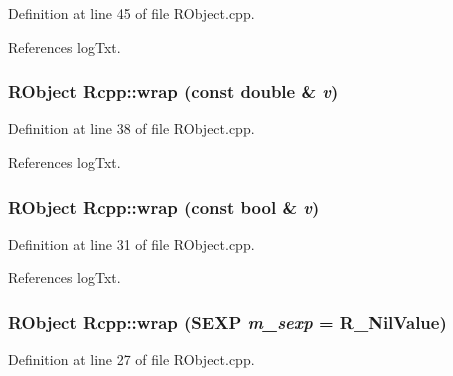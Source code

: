 Definition at line 45 of file RObject.cpp.

References logTxt.\hypertarget{namespaceRcpp_a4736ca32ac9aef778a1cddf60171fd9c}{
\subsubsection[{wrap}]{\setlength{\rightskip}{0pt plus 5cm}RObject Rcpp::wrap (const double \& {\em v})}}
\label{namespaceRcpp_a4736ca32ac9aef778a1cddf60171fd9c}


Definition at line 38 of file RObject.cpp.

References logTxt.\hypertarget{namespaceRcpp_afec8977a6c3fcfc0ab37a9e2a7ba9657}{
\subsubsection[{wrap}]{\setlength{\rightskip}{0pt plus 5cm}RObject Rcpp::wrap (const bool \& {\em v})}}
\label{namespaceRcpp_afec8977a6c3fcfc0ab37a9e2a7ba9657}


Definition at line 31 of file RObject.cpp.

References logTxt.\hypertarget{namespaceRcpp_aa47be58d105b733ced235de53b5691af}{
\subsubsection[{wrap}]{\setlength{\rightskip}{0pt plus 5cm}RObject Rcpp::wrap (SEXP {\em m\_\-sexp} = {\ttfamily R\_\-NilValue})}}
\label{namespaceRcpp_aa47be58d105b733ced235de53b5691af}


Definition at line 27 of file RObject.cpp.